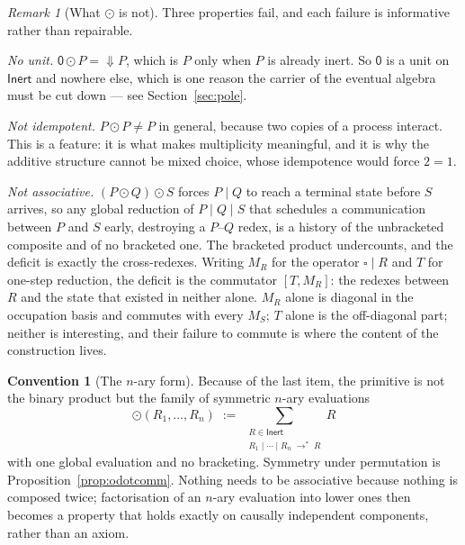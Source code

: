 \documentclass[11pt]{article}
\theoremstyle{definition}
\newtheorem{convention}[theorem]{Convention}
\theoremstyle{remark}
\newtheorem{remark}[theorem]{Remark}
\newcommand{\pzero}{\mathsf{0}}
\newcommand{\red}{\ensuremath{\rightarrow}}
\begin{document}
\begin{remark}[What $\odot$ is not]
\label{rem:odotalgebra}
Three properties fail, and each failure is informative rather than repairable.

\emph{No unit.} $\pzero \odot P = \Downarrow P$, which is $P$ only when $P$ is
already inert. So $\pzero$ is a unit on $\mathsf{Inert}$ and nowhere else, which
is one reason the carrier of the eventual algebra must be cut down --- see
Section~\ref{sec:pole}.

\emph{Not idempotent.} $P \odot P \neq P$ in general, because two copies of a
process interact. This is a feature: it is what makes multiplicity meaningful,
and it is why the additive structure cannot be mixed choice, whose idempotence
would force $2 = 1$.

\emph{Not associative.} $(P \odot Q) \odot S$ forces $P \mid Q$ to reach a
terminal state before $S$ arrives, so any global reduction of $P \mid Q \mid S$
that schedules a communication between $P$ and $S$ early, destroying a
$P$--$Q$ redex, is a history of the unbracketed composite and of no bracketed
one. The bracketed product undercounts, and the deficit is exactly the
cross-redexes. Writing $M_R$ for the operator $\square \mid R$ and $T$ for
one-step reduction, the deficit is the commutator $[T, M_R]$: the redexes
between $R$ and the state that existed in neither alone. $M_R$ alone is diagonal
in the occupation basis and commutes with every $M_S$; $T$ alone is the
off-diagonal part; neither is interesting, and their failure to commute is where
the content of the construction lives.
\end{remark}

\begin{convention}[The $n$-ary form]
\label{con:nary}
Because of the last item, the primitive is not the binary product but the
family of symmetric $n$-ary evaluations
\[
  \odot(R_1, \ldots, R_n) \;:=\;
  \sum_{\substack{R \in \mathsf{Inert} \\ R_1 \mid \cdots \mid R_n \;\red^{*}\; R}} R
\]
with one global evaluation and no bracketing. Symmetry under permutation is
Proposition~\ref{prop:odotcomm}. Nothing needs to be associative because nothing
is composed twice; factorisation of an $n$-ary evaluation into lower ones then
becomes a property that holds exactly on causally independent components, rather
than an axiom.
\end{convention}
\end{document}
